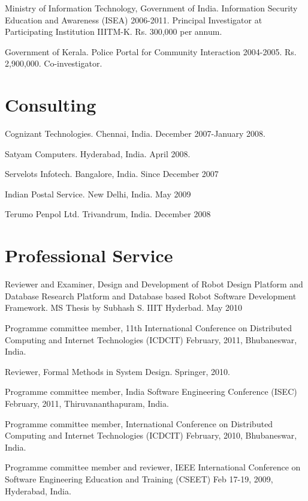 \documentclass[11pt,margin,line]{res}
\begin{document}
\begin{resume}
Ministry of Information Technology, Government of India.
Information Security Education and Awareness (ISEA)
2006-2011.  Principal Investigator at Participating
Institution IIITM-K.  Rs. 300,000 per annum. 

Government of Kerala.  Police Portal for Community
Interaction 2004-2005.  Rs. 2,900,000.  Co-investigator.



\section{\sc Consulting}

Cognizant Technologies.  Chennai, India.  December
2007-January 2008.

Satyam Computers.  Hyderabad, India.  April 2008.

Servelots Infotech.  Bangalore, India.  Since December 2007

Indian Postal Service.   New Delhi, India.  May 2009

Terumo Penpol Ltd.  Trivandrum, India.  December 2008


\newpage

\section{\sc Professional Service}


Reviewer and Examiner, Design and Development of Robot
Design Platform and Database Research Platform and Database
based Robot Software Development Framework.  MS Thesis by
Subhash S. IIIT Hyderbad.  May 2010

Programme committee member, 11th International Conference on
Distributed Computing and Internet Technologies (ICDCIT)
February, 2011, Bhubaneswar, India.

Reviewer,  Formal Methods in System Design.  Springer, 2010.

Programme committee member, India Software Engineering
Conference (ISEC) February, 2011, Thiruvananthapuram, India.

Programme committee member, International Conference on
Distributed Computing and Internet Technologies (ICDCIT)
February, 2010, Bhubaneswar, India.

Programme committee member and reviewer, IEEE International
Conference on Software Engineering Education and Training
(CSEET) Feb 17-19, 2009, Hyderabad, India.



\end{resume}
\end{document}
